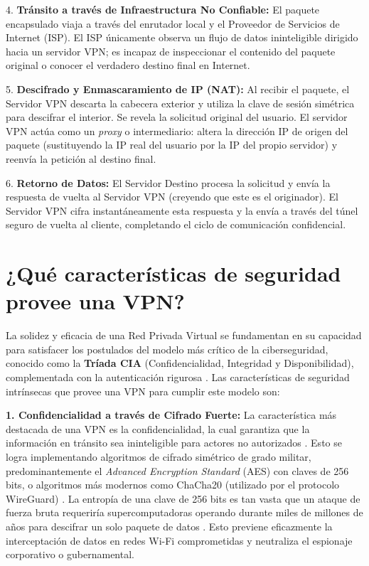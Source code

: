 \documentclass[a4paper,12pt]{article}
\begin{document}
4. \textbf{Tránsito a través de Infraestructura No Confiable:} El paquete encapsulado viaja a través del enrutador local y el Proveedor de Servicios de Internet (ISP). El ISP únicamente observa un flujo de datos ininteligible dirigido hacia un servidor VPN; es incapaz de inspeccionar el contenido del paquete original o conocer el verdadero destino final en Internet.

5. \textbf{Descifrado y Enmascaramiento de IP (NAT):} Al recibir el paquete, el Servidor VPN descarta la cabecera exterior y utiliza la clave de sesión simétrica para descifrar el interior. Se revela la solicitud original del usuario. El servidor VPN actúa como un \textit{proxy} o intermediario: altera la dirección IP de origen del paquete (sustituyendo la IP real del usuario por la IP del propio servidor) y reenvía la petición al destino final.

6. \textbf{Retorno de Datos:} El Servidor Destino procesa la solicitud y envía la respuesta de vuelta al Servidor VPN (creyendo que este es el originador). El Servidor VPN cifra instantáneamente esta respuesta y la envía a través del túnel seguro de vuelta al cliente, completando el ciclo de comunicación confidencial.


\newpage
\section{¿Qué características de seguridad provee una VPN?}

La solidez y eficacia de una Red Privada Virtual se fundamentan en su capacidad para satisfacer los postulados del modelo más crítico de la ciberseguridad, conocido como la \textbf{Tríada CIA} (Confidencialidad, Integridad y Disponibilidad), complementada con la autenticación rigurosa \cite{checkpoint_vpn, netwrix_cia}. Las características de seguridad intrínsecas que provee una VPN para cumplir este modelo son:

\textbf{1. Confidencialidad a través de Cifrado Fuerte:}
La característica más destacada de una VPN es la confidencialidad, la cual garantiza que la información en tránsito sea ininteligible para actores no autorizados \cite{aws_vpn}. Esto se logra implementando algoritmos de cifrado simétrico de grado militar, predominantemente el \textit{Advanced Encryption Standard} (AES) con claves de 256 bits, o algoritmos más modernos como ChaCha20 (utilizado por el protocolo WireGuard) \cite{ibm_vpn}. La entropía de una clave de 256 bits es tan vasta que un ataque de fuerza bruta requeriría supercomputadoras operando durante miles de millones de años para descifrar un solo paquete de datos \cite{kaspersky_vpn}. Esto previene eficazmente la interceptación de datos en redes Wi-Fi comprometidas y neutraliza el espionaje corporativo o gubernamental.
\end{document}
